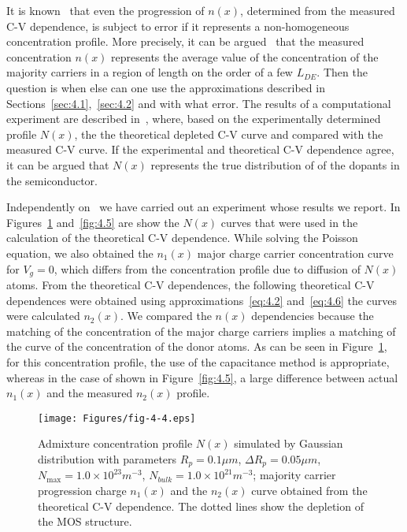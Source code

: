 \par It is known~\cite{4.18} that even the progression of $n(x)$,
determined from the measured C-V dependence, is subject to error if it
represents a non-homogeneous concentration profile. More precisely, it
can be argued~\cite{4.3} that the measured concentration $n(x)$
represents the average value of the concentration of the majority
carriers in a region of length on the order of a few $L_{DE}$. Then
the question is when else can one use the approximations described in
Sections~\ref{sec:4.1},~\ref{sec:4.2} and with what error. The results
of a computational experiment are described in~\cite{4.22}, where,
based on the experimentally determined profile $N(x)$, the the
theoretical depleted C-V curve and compared with the measured C-V
curve. If the experimental and theoretical C-V dependence agree, it
can be argued that $N(x)$ represents the true distribution of of the
dopants in the semiconductor.

\par Independently on~\cite{4.22} we have carried out an experiment
whose results we report. In Figures~\ref{fig:4.4} and~\ref{fig:4.5}
are show the $N(x)$ curves that were used in the calculation of the
theoretical C-V dependence. While solving the Poisson equation, we
also obtained the $n_{1}(x)$ major charge carrier concentration curve
for $V_{g}=0$, which differs from the concentration profile due to
diffusion of $N(x)$ atoms. From the theoretical C-V dependences, the
following theoretical C-V dependences were obtained using
approximations~\ref{eq:4.2} and~\ref{eq:4.6} the curves were
calculated $n_{2}(x)$.  We compared the $n(x)$ dependencies because
the matching of the concentration of the major charge carriers implies
a matching of the curve of the concentration of the donor atoms. As
can be seen in Figure~\ref{fig:4.4}, for this concentration profile,
the use of the capacitance method is appropriate, whereas in the case
of shown in Figure~\ref{fig:4.5}, a large difference between actual
$n_{1}(x)$ and the measured $n_{2}(x)$ profile.

\begin{figure}[h!]\centering
  \begin{minipage}[c]{\myfiguresize}
    \begin{center}
      \texttt{[image: Figures/fig-4-4.eps]}
      \caption[Gaussian simulated impurity concentration
        distribution]{Admixture concentration profile $N(x)$ simulated
        by Gaussian distribution with parameters $R_{p}=0.1\mu m$,
        $\Delta R_{p}=0.05\mu m$, $N_{\max}=1.0\times 10^{23} m^{-3}$,
        $N_{bulk}=1.0\times10^{21}m^{-3}$; majority carrier
        progression charge $n_{1}(x)$ and the $n_{2}(x)$ curve
        obtained from the theoretical C-V dependence. The dotted lines
        show the depletion of the MOS structure.}\label{fig:4.4}
    \end{center}
  \end{minipage}
\end{figure}

